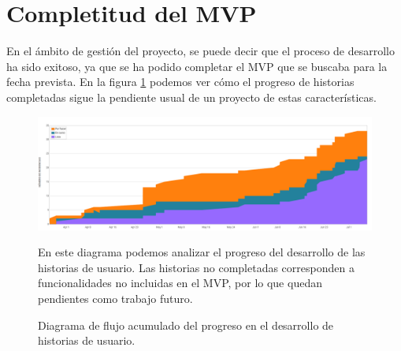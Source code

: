\section{Completitud del MVP}

En el ámbito de gestión del proyecto, se puede decir que el proceso de desarrollo ha sido exitoso, ya que se ha podido completar el MVP que se buscaba para la fecha prevista. En la figura \ref{fig:jira_num_issues} podemos ver cómo el progreso de historias completadas sigue la pendiente usual de un proyecto de estas características.

\begin{figure}
    \centering
    \centerline{\includegraphics[width=0.8\paperwidth]{imagenes/jira_num_issues.png}}
    \caption{Diagrama de flujo acumulado del progreso en el desarrollo de historias de usuario.} En este diagrama podemos analizar el progreso del desarrollo de las historias de usuario. Las historias no completadas corresponden a funcionalidades no incluidas en el MVP, por lo que quedan pendientes como trabajo futuro.
    \label{fig:jira_num_issues}
\end{figure}